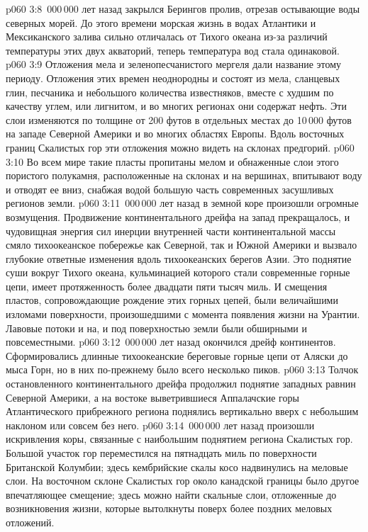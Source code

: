 \vs p060 3:8 \,000\,000 лет назад закрылся Берингов пролив, отрезав остывающие воды северных морей. До этого времени морская жизнь в водах Атлантики и Мексиканского залива сильно отличалась от Тихого океана из\hyp{}за различий температуры этих двух акваторий, теперь температура вод стала одинаковой.
\vs p060 3:9 Отложения мела и зеленопесчанистого мергеля дали название этому периоду. Отложения этих времен неоднородны и состоят из мела, сланцевых глин, песчаника и небольшого количества известняков, вместе с худшим по качеству углем, или лигнитом, и во многих регионах они содержат нефть. Эти слои изменяются по толщине от 200 футов в отдельных местах до 10\,000 футов на западе Северной Америки и во многих областях Европы. Вдоль восточных границ Скалистых гор эти отложения можно видеть на склонах предгорий.
\vs p060 3:10 Во всем мире такие пласты пропитаны мелом и обнаженные слои этого пористого полукамня, расположенные на склонах и на вершинах, впитывают воду и отводят ее вниз, снабжая водой большую часть современных засушливых регионов земли.
\vs p060 3:11 \,000\,000 лет назад в земной коре произошли огромные возмущения. Продвижение континентального дрейфа на запад прекращалось, и чудовищная энергия сил инерции внутренней части континентальной массы смяло тихоокеанское побережье как Северной, так и Южной Америки и вызвало глубокие ответные изменения вдоль тихоокеанских берегов Азии. Это поднятие суши вокруг Тихого океана, кульминацией которого стали современные горные цепи, имеет протяженность более двадцати пяти тысяч миль. И смещения пластов, сопровождающие рождение этих горных цепей, были величайшими изломами поверхности, произошедшими с момента появления жизни на Урантии. Лавовые потоки и на, и под поверхностью земли были обширными и повсеместными.
\vs p060 3:12 \,000\,000 лет назад окончился дрейф континентов. Сформировались длинные тихоокеанские береговые горные цепи от Аляски до мыса Горн, но в них по\hyp{}прежнему было всего несколько пиков.
\vs p060 3:13 Толчок остановленного континентального дрейфа продолжил поднятие западных равнин Северной Америки, а на востоке выветрившиеся Аппалачские горы Атлантического прибрежного региона поднялись вертикально вверх с небольшим наклоном или совсем без него.
\vs p060 3:14 \,000\,000 лет назад произошли искривления коры, связанные с наибольшим поднятием региона Скалистых гор. Большой участок гор переместился на пятнадцать миль по поверхности Британской Колумбии; здесь кембрийские скалы косо надвинулись на меловые слои. На восточном склоне Скалистых гор около канадской границы было другое впечатляющее смещение; здесь можно найти скальные слои, отложенные до возникновения жизни, которые вытолкнуты поверх более поздних меловых отложений.
